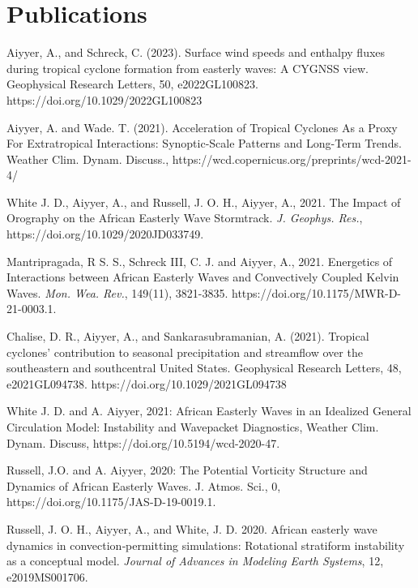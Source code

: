 \section*{Publications}

\begin{ilist}


  
\item  Aiyyer, A., and Schreck, C. (2023). Surface wind speeds and enthalpy fluxes during tropical cyclone formation from easterly waves: A CYGNSS view. Geophysical Research Letters, 50, e2022GL100823. https://doi.org/10.1029/2022GL100823
  
\item Aiyyer, A. and Wade. T. (2021). Acceleration of Tropical Cyclones As a Proxy For Extratropical
Interactions: Synoptic-Scale Patterns and Long-Term Trends. Weather Clim. Dynam. Discuss., https://wcd.copernicus.org/preprints/wcd-2021-4/

\item White J. D., Aiyyer, A., and Russell, J. O. H., Aiyyer, A., 2021. The Impact of Orography on the African Easterly Wave Stormtrack.  \emph{J. Geophys. Res.}, https://doi.org/10.1029/2020JD033749.
  

\item Mantripragada, R S. S., Schreck III, C. J. and Aiyyer, A., 2021. Energetics of Interactions between African Easterly Waves and Convectively Coupled Kelvin Waves.  \emph{Mon. Wea. Rev.}, 149(11), 3821-3835.  https://doi.org/10.1175/MWR-D-21-0003.1.

\item Chalise, D. R., Aiyyer, A., and Sankarasubramanian, A. (2021). Tropical cyclones’ contribution to seasonal precipitation and streamflow over the southeastern and southcentral United States. Geophysical Research Letters, 48, e2021GL094738. https://doi.org/10.1029/2021GL094738
  
\item White J. D. and A. Aiyyer, 2021: African Easterly Waves in an Idealized General Circulation Model: Instability and Wavepacket Diagnostics, Weather Clim. Dynam. Discuss, https://doi.org/10.5194/wcd-2020-47.
 
\item Russell, J.O. and A. Aiyyer, 2020: The Potential Vorticity Structure and Dynamics of African Easterly Waves. J. Atmos. Sci., 0, https://doi.org/10.1175/JAS-D-19-0019.1.

\item Russell, J. O. H., Aiyyer, A., and White, J. D. 2020. African easterly wave dynamics in convection‐permitting simulations: Rotational stratiform instability as a conceptual model. \emph{Journal of Advances in Modeling Earth Systems}, 12, e2019MS001706.
  

\end{ilist}
